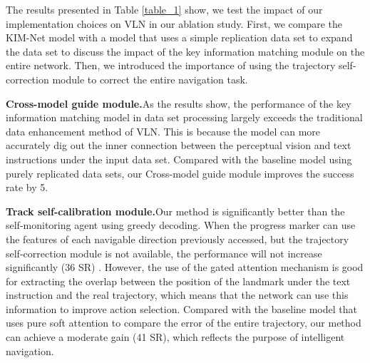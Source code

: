 The results presented in Table \ref{table_1} show, we test the impact of our implementation choices on VLN in our ablation study. First, we compare the KIM-Net model with a model that uses a simple replication data set to expand the data set to discuss the impact of the key information matching module on the entire network. Then, we introduced the importance of using the trajectory self-correction module to correct the entire navigation task.

\textbf{Cross-model guide module.}As the results show, the performance of the key information matching model in data set processing largely exceeds the traditional data enhancement method of VLN. This is because the model can more accurately dig out the inner connection between the perceptual vision and text instructions under the input data set. Compared with the baseline model using purely replicated data sets, our Cross-model guide module improves the success rate by 5.

\textbf{Track self-calibration module.}Our method is significantly better than the self-monitoring agent using greedy decoding. When the progress marker can use the features of each navigable direction previously accessed, but the trajectory self-correction module is not available, the performance will not increase significantly (36 SR) . However, the use of the gated attention mechanism is good for extracting the overlap between the position of the landmark under the text instruction and the real trajectory, which means that the network can use this information to improve action selection. Compared with the baseline model that uses pure soft attention to compare the error of the entire trajectory, our method can achieve a moderate gain (41 SR), which reflects the purpose of intelligent navigation.

